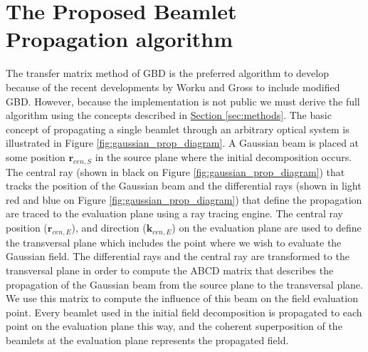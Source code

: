 \section{The Proposed Beamlet Propagation algorithm}
\label{sec:algorithm}
The transfer matrix method of GBD is the preferred algorithm to develop because of the recent developments by Worku and Gross to include modified GBD\cite{Worku19}. However, because the implementation is not public we must derive the full algorithm using the concepts described in \hyperref[sec:methods]{Section \ref{sec:methods}}. The basic concept of propagating a single beamlet through an arbitrary optical system is illustrated in Figure \ref{fig:gaussian_prop_diagram}. A Gaussian beam is placed at some position $\mathbf{r}_{cen,S}$ in the source plane where the initial decomposition occurs. The central ray (shown in black on Figure \ref{fig:gaussian_prop_diagram}) that tracks the position of the Gaussian beam and the differential rays (shown in light red and blue on Figure \ref{fig:gaussian_prop_diagram}) that define the propagation are traced to the evaluation plane using a ray tracing engine. The central ray position ($\mathbf{r}_{cen,E}$), and direction ($\mathbf{k}_{cen,E}$) on the evaluation plane are used to define the transversal plane which includes the point where we wish to evaluate the Gaussian field. The differential rays and the central ray are transformed to the transversal plane in order to compute the ABCD matrix that describes the propagation of the Gaussian beam from the source plane to the transversal plane. We use this matrix to compute the influence of this beam on the field evaluation point. Every beamlet used in the initial field decomposition is propagated to each point on the evaluation plane this way, and the coherent superposition of the beamlets at the evaluation plane represents the propagated field.

